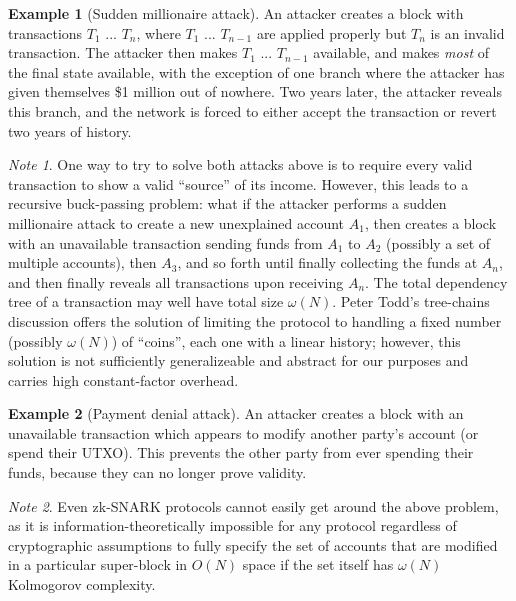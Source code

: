 \documentclass[11pt,a4paper]{report}
\theoremstyle{plain}
\theoremstyle{definition}
\newtheorem{exmp}{Example}[section]
\theoremstyle{remark}
\newtheorem*{note}{Note}
\begin{document}
\begin{exmp}[Sudden millionaire attack]
An attacker creates a block with transactions $T_1$ ... $T_n$, where $T_1$ ... $T_{n-1}$ are applied properly but $T_n$ is an invalid transaction. The attacker then makes $T_1$ ... $T_{n-1}$ available, and makes \emph{most} of the final state available, with the exception of one branch where the attacker has given themselves \$1 million out of nowhere. Two years later, the attacker reveals this branch, and the network is forced to either accept the transaction or revert two years of history.
\end{exmp}

\begin{note}
One way to try to solve both attacks above is to require every valid transaction to show a valid ``source'' of its income. However, this leads to a recursive buck-passing problem: what if the attacker performs a sudden millionaire attack to create a new unexplained account $A_1$, then creates a block with an unavailable transaction sending funds from $A_1$ to $A_2$ (possibly a set of multiple accounts), then $A_3$, and so forth until finally collecting the funds at $A_n$, and then finally reveals all transactions upon receiving $A_n$. The total dependency tree of a transaction may well have total size $\omega(N)$. Peter Todd's tree-chains discussion offers the solution \citep{todd_re:_2014} of limiting the protocol to handling a fixed number (possibly $\omega(N)$) of ``coins'', each one with a linear history; however, this solution is not sufficiently generalizeable and abstract for our purposes and carries high constant-factor overhead.
\end{note}

\begin{exmp}[Payment denial attack]
An attacker creates a block with an unavailable transaction which appears to modify another party's account (or spend their UTXO). This prevents the other party from ever spending their funds, because they can no longer prove validity.
\end{exmp}

\begin{note}
Even zk-SNARK protocols cannot easily get around the above problem, as it is information-theoretically impossible for any protocol regardless of cryptographic assumptions to fully specify the set of accounts that are modified in a particular super-block in $O(N)$ space if the set itself has $\omega(N)$ Kolmogorov complexity.
\end{note}
\end{document}
